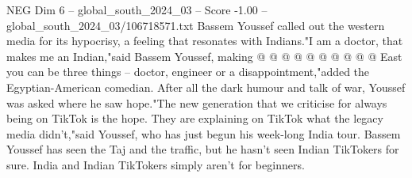 \begin{textsample}{NEG Dim 6 – global\_south\_2024\_03 – Score -1.00 – global\_south\_2024\_03/106718571.txt}
Bassem Youssef called out the western media for its hypocrisy, a feeling that resonates with Indians."I am a doctor, that makes me an Indian,"said Bassem Youssef, making @ @ @ @ @ @ @ @ @ @ East you can be three things -- doctor, engineer or a disappointment,"added the Egyptian-American comedian.
After all the dark humour and talk of war, Youssef was asked where he saw hope."The new generation that we criticise for always being on TikTok is the hope.
They are explaining on TikTok what the legacy media didn't,"said Youssef, who has just begun his week-long India tour.
Bassem Youssef has seen the Taj and the traffic, but he hasn't seen Indian TikTokers for sure.
India and Indian TikTokers simply aren't for beginners.

\end{textsample}
